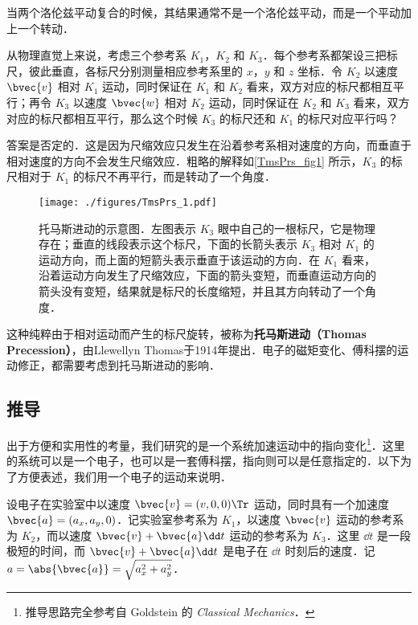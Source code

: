 

当两个洛伦兹平动复合的时候，其结果通常不是一个洛伦兹平动，而是一个平动加上一个转动．

从物理直觉上来说，考虑三个参考系 $K_1$，$K_2$ 和 $K_3$．每个参考系都架设三把标尺，彼此垂直，各标尺分别测量相应参考系里的 $x$，$y$ 和 $z$ 坐标．令 $K_2$ 以速度 $\bvec{v}$ 相对 $K_1$ 运动，同时保证在 $K_1$ 和 $K_2$ 看来，双方对应的标尺都相互平行；再令 $K_3$ 以速度 $\bvec{w}$ 相对 $K_2$ 运动，同时保证在 $K_2$ 和 $K_3$ 看来，双方对应的标尺都相互平行，那么这个时候 $K_3$ 的标尺还和 $K_1$ 的标尺对应平行吗？

答案是否定的．这是因为尺缩效应只发生在沿着参考系相对速度的方向，而垂直于相对速度的方向不会发生尺缩效应．粗略的解释如\autoref{TmsPrs_fig1} 所示，$K_3$ 的标尺相对于 $K_1$ 的标尺不再平行，而是转动了一个角度．

\begin{figure}[ht]
\centering
\texttt{[image: ./figures/TmsPrs\_1.pdf]}
\caption{托马斯进动的示意图．左图表示 $K_3$ 眼中自己的一根标尺，它是物理存在；垂直的线段表示这个标尺，下面的长箭头表示 $K_3$ 相对 $K_1$ 的运动方向，而上面的短箭头表示垂直于该运动的方向．在 $K_1$ 看来，沿着运动方向发生了尺缩效应，下面的箭头变短，而垂直运动方向的箭头没有变短，结果就是标尺的长度缩短，并且其方向转动了一个角度．} \label{TmsPrs_fig1}
\end{figure}

这种纯粹由于相对运动而产生的标尺旋转，被称为\textbf{托马斯进动（Thomas Precession）}，由Llewellyn Thomas于1914年提出．电子的磁矩变化、傅科摆的运动修正，都需要考虑到托马斯进动的影响．

\subsection{推导}

出于方便和实用性的考量，我们研究的是一个系统加速运动中的指向变化\footnote{推导思路完全参考自 Goldstein 的 \textsl{Classical Mechanics}\cite{Goldstein}．}．这里的系统可以是一个电子，也可以是一套傅科摆，指向则可以是任意指定的．以下为了方便表述，我们用一个电子的运动来说明．

设电子在实验室中以速度 $\bvec{v}=(v, 0, 0)\Tr$ 运动，同时具有一个加速度 $\bvec{a}=(a_x, a_y, 0)$．记实验室参考系为 $K_1$，以速度 $\bvec{v}$ 运动的参考系为 $K_2$，而以速度 $\bvec{v}+\bvec{a}\dd t$ 运动的参考系为 $K_3$．这里 $\dd t$ 是一段极短的时间，而 $\bvec{v}+\bvec{a}\dd t$ 是电子在 $\dd t$ 时刻后的速度．记 $a=\abs{\bvec{a}}=\sqrt{a_x^2+a_y^2}$．

